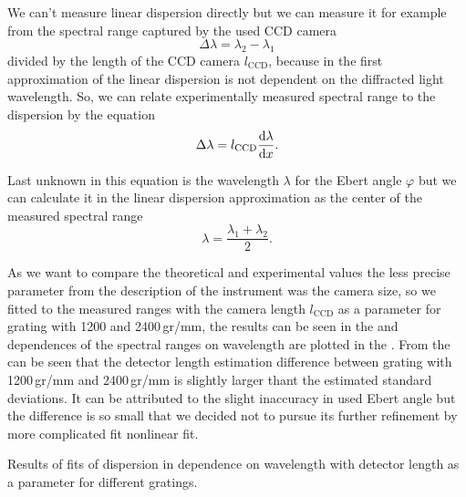 We can't measure linear dispersion directly but we can measure it for example
from the spectral range captured by the used CCD camera
\begin{equation*}
	\Delta\lambda = \lambda_2 - \lambda_1
\end{equation*}
divided by the length of the CCD camera $l_\text{CCD}$, because in the first
approximation of
the linear dispersion is not dependent on the diffracted light wavelength. So,
we can relate experimentally measured spectral range to the dispersion by the
equation
\begin{equation}
	\Delta\lambda = l_\text{CCD}\frac{\text{d}\lambda}{\text{d}x}.
	\label{\eqnlabel{spectrograph_selection:measured_range}}
\end{equation}

Last unknown in this equation is the wavelength $\lambda$ for the Ebert angle
$\varphi$ but we can calculate it in the linear dispersion approximation as the
center of the measured spectral range
\begin{equation*}
	\lambda = \frac{\lambda_1 + \lambda_2}{2}.
\end{equation*}

As we want to compare the theoretical and experimental values the less precise
parameter from the description of the instrument was the camera size, so we
fitted
to the measured ranges with the camera length $l_\text{CCD}$ as a parameter for
grating with 1200 and 2400\,gr/mm, the results can be seen in the
and dependences of the spectral ranges on wavelength are plotted in the
.
From the
can be seen that the detector length estimation difference between grating
with 1200\,gr/mm and 2400\,gr/mm is slightly larger thant the estimated
standard deviations. It can be attributed to the slight inaccuracy in used
Ebert angle but the difference is so small that we decided not to pursue its
further refinement by more complicated fit nonlinear fit.

\begin{table}
	\centering
	
	\caption{Results of fits of dispersion in dependence on wavelength with
		detector length as a parameter for different gratings.}
	\label{\tablabel{spectrograph_selection:detector_length_fits}}
\end{table}

